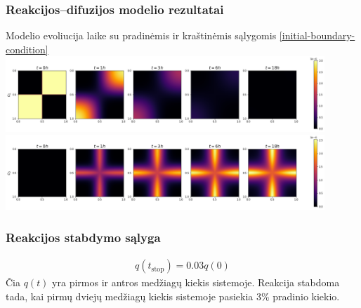 \documentclass{beamer}
\begin{document}
\begin{frame}
    \frametitle{Reakcijos--difuzijos modelio rezultatai}
    Modelio evoliucija laike su pradinėmis ir kraštinėmis sąlygomis \eqref{initial-boundary-condition}
    \centering
    \includegraphics[width=12cm]{paper/assets/example-0.png} \\ 
    \includegraphics[width=12cm]{paper/assets/example-2.png}

\end{frame}

\begin{frame}
    \frametitle{Reakcijos stabdymo sąlyga}
    \begin{align*}
        q(t_\text{stop})=0.03q(0)
    \end{align*}
    Čia $q(t)$ yra pirmos ir antros medžiagų kiekis sistemoje. Reakcija stabdoma tada, kai pirmų dviejų medžiagų kiekis sistemoje pasiekia 3\% pradinio kiekio.
\end{frame}
\end{document}
